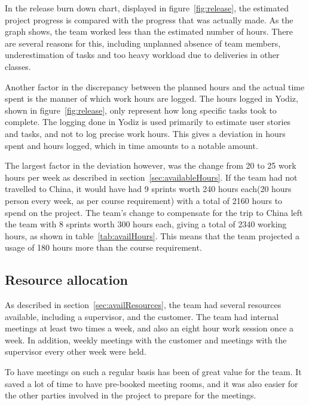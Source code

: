 \noindent In the release burn down chart, displayed in figure~\ref{fig:release}, the estimated project progress is compared with the progress that was actually made. As the graph shows, the team worked less than the estimated number of hours. There are several reasons for this, including unplanned absence of team members, underestimation of tasks and too heavy workload due to deliveries in other classes. 

Another factor in the discrepancy between the planned hours and the actual time spent is the manner of which work hours are logged. The hours logged in Yodiz, shown in figure~\ref{fig:release}, only represent how long specific tasks took to complete. The logging done in Yodiz is used primarily to estimate user stories and tasks, and not to log precise work hours. This gives a deviation in hours spent and hours logged, which in time amounts to a notable amount. 

The largest factor in the deviation however, was the change from 20 to 25 work hours per week as described in section~\ref{sec:availableHours}. If the team had not travelled to China, it would have had 9 sprints worth 240 hours each(20 hours person every week, as per course requirement) with a total of 2160 hours to spend on the project. The team's change to compensate for the trip to China left the team with 8 sprints worth 300 hours each, giving a total of 2340 working hours, as shown in table~\ref{tab:availHours}. This means that the team projected a usage of 180 hours more than the course requirement.



\subsection{Resource allocation}
As described in section~\ref{sec:availResources}, the team had several resources available, including a supervisor, and the customer. The team had internal meetings at least two times a week, and also an eight hour work session once a week. In addition, weekly meetings with the customer and meetings with the supervisor every other week were held.

To have meetings on such a regular basis has been of great value for the team. It saved a lot of time to have pre-booked meeting rooms, and it was also easier for the other parties involved in the project to prepare for the meetings.

